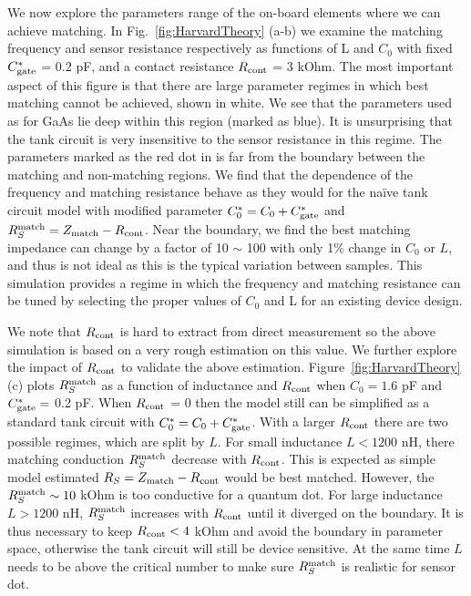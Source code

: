 \documentclass[]{article}
\begin{document}
	We now explore the parameters range of the on-board elements where we can achieve matching. In Fig.\ \ref{fig:HarvardTheory} (a-b) we examine the matching frequency and sensor resistance respectively as functions of L and $C_0$ with fixed $C^*_{\rm gate}$ = 0.2 pF, and a contact resistance $R_{\rm cont}$ = 3 kOhm.  The most important aspect of this figure is that there are large parameter regimes in which best matching cannot be achieved, shown in white.  We see that the parameters used as for GaAs lie deep within this region (marked as blue). It is unsurprising that the tank circuit is very insensitive to the sensor resistance in this regime. The parameters marked as the red dot in is far from the boundary between the matching and non-matching regions. 
	We find that the dependence of the frequency and matching resistance behave as they would for the naïve tank circuit model with modified parameter $C^*_0 = C_0 + C^*_{\rm gate}$ and $R^{\rm match}_S = Z_{\rm match}-R_{\rm cont}$. Near the boundary, we find the best matching impedance can change by a factor of 10 $\sim$ 100 with only 1\% change in $C_0$ or $L$, and thus is not ideal as this is the typical variation between samples. This simulation provides a regime in which the frequency and matching resistance can be tuned by selecting the proper values of $C_0$ and L for an existing device design.   
	
	We note that $R_{\rm cont}$ is hard to extract from direct measurement so the above simulation is based on a very rough estimation on this value. We further explore the impact of $R_{\rm cont}$ to validate the above estimation. Figure\ \ref{fig:HarvardTheory}(c) plots $R^{\rm match}_S$ as a function of inductance and $R_{\rm cont}$ when $C_0 = 1.6$ pF and $C^*_{\rm gate} =$ 0.2 pF. When $R_{\rm cont}$ = 0 then the model still can be simplified as a standard tank circuit with $C^*_0 = C_0 + C^*_{\rm gate}$. 
	With a larger $R_{\rm cont}$ there are two possible regimes, which are split by $L$. For small inductance $L<1200$ nH, there matching conduction $R^{\rm match}_S$ decrease with $R_{\rm cont}$. This is expected as simple model estimated  $R_S = Z_{\rm match}-R_{\rm cont}$ would be best matched. However, the  $R^{\rm match}_S\sim 10$ kOhm is too conductive for a quantum dot. For large inductance $L>1200$ nH,  $R^{\rm match}_S$ increases with $R_{\rm cont}$ until it diverged on the boundary. It is thus necessary to keep $R_{\rm cont}<4$ kOhm and avoid the boundary in parameter space, otherwise the tank circuit will still be device sensitive. At the same time $L$ needs to be above the critical number to make sure  $R^{\rm match}_S$ is realistic for sensor dot. 
	 
\end{document}
